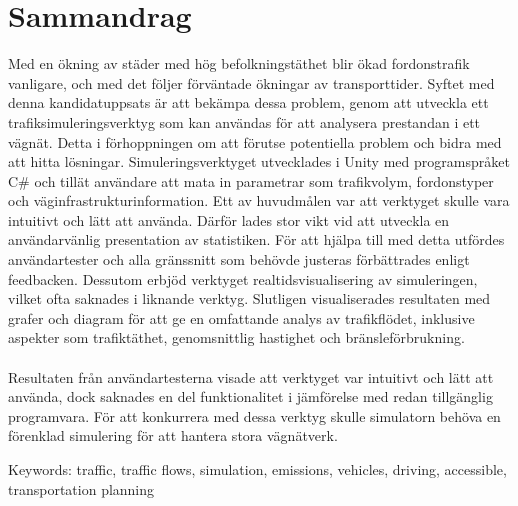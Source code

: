 \section*{Sammandrag}
    Med en ökning av städer med hög befolkningstäthet blir ökad fordonstrafik vanligare, och med det följer förväntade ökningar av transporttider. Syftet med denna kandidatuppsats är att bekämpa dessa problem, genom att utveckla ett trafiksimuleringsverktyg som kan användas för att analysera prestandan i ett vägnät. Detta i förhoppningen om att förutse potentiella problem och bidra med att hitta lösningar. Simuleringsverktyget utvecklades i Unity med programspråket C\# och tillät användare att mata in parametrar som trafikvolym, fordonstyper och väginfrastrukturinformation. Ett av huvudmålen var att verktyget skulle vara intuitivt och lätt att använda. Därför lades stor vikt vid att utveckla en användarvänlig presentation av statistiken. För att hjälpa till med detta utfördes användartester och alla gränssnitt som behövde justeras förbättrades enligt feedbacken. Dessutom erbjöd verktyget realtidsvisualisering av simuleringen, vilket ofta saknades i liknande verktyg. Slutligen visualiserades resultaten med grafer och diagram för att ge en omfattande analys av trafikflödet, inklusive aspekter som trafiktäthet, genomsnittlig hastighet och bränsleförbrukning. 
    \\\\
    Resultaten från användartesterna visade att verktyget var intuitivt och lätt att använda, dock saknades en del funktionalitet i jämförelse med redan tillgänglig programvara. För att konkurrera med dessa verktyg skulle simulatorn behöva en förenklad simulering för att hantera stora vägnätverk.


\vfill
Keywords: traffic, traffic flows, simulation, emissions, vehicles, driving, accessible, transportation planning

\newpage
\thispagestyle{empty}
\mbox{}